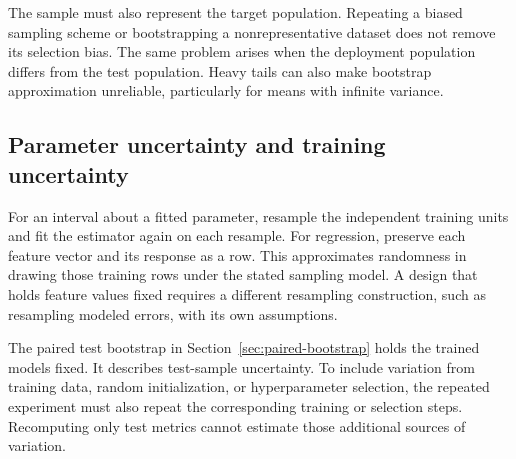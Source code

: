 The sample must also represent the target population. Repeating a
biased sampling scheme or bootstrapping a nonrepresentative dataset
does not remove its selection bias. The same problem arises when the
deployment population differs from the test population. Heavy tails
can also make bootstrap approximation unreliable, particularly for
means with infinite variance.

\subsection{Parameter uncertainty and training uncertainty}

For an interval about a fitted parameter, resample the independent
training units and fit the estimator again on each resample. For
regression, preserve each feature vector and its response as a row.
This approximates randomness in drawing those training rows under
the stated sampling model. A design that holds feature values fixed
requires a different resampling construction, such as resampling
modeled errors, with its own assumptions.

The paired test bootstrap in Section~\ref{sec:paired-bootstrap}
holds the trained models fixed. It describes test-sample uncertainty.
To include variation from training data, random initialization, or
hyperparameter selection, the repeated experiment must also repeat
the corresponding training or selection steps. Recomputing only
test metrics cannot estimate those additional sources of variation.

\endgroup
